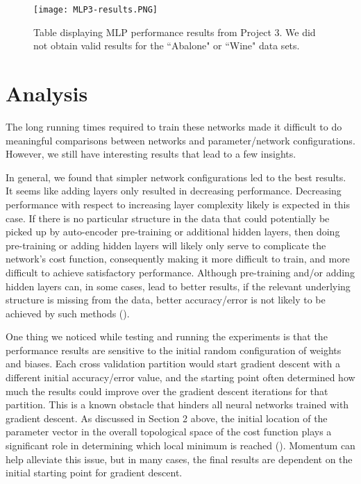 \documentclass[twoside,11pt]{article}
\begin{document}
    \begin{figure}[h]
        \centering
        \texttt{[image: MLP3-results.PNG]}
        \caption{Table displaying MLP performance results from Project 3. We did not obtain valid results for the ``Abalone" or ``Wine" data sets.}
        \label{fig:my_label}
    \end{figure}

\newpage
\section{Analysis}

The long running times required to train these networks made it difficult to do meaningful comparisons between networks and parameter/network configurations. However, we still have interesting results that lead to a few insights.

In general, we found that simpler network configurations led to the best results. It seems like adding layers only resulted in decreasing performance. Decreasing performance with respect to increasing layer complexity likely is expected in this case. If there is no particular structure in the data that could potentially be picked up by auto-encoder pre-training or additional hidden layers, then doing pre-training or adding hidden layers will likely only serve to complicate the network's cost function, consequently making it more difficult to train, and more difficult to achieve satisfactory performance. Although pre-training and/or adding hidden layers can, in some cases, lead to better results, if the relevant underlying structure is missing from the data, better accuracy/error is not likely to be achieved by such methods (\cite{hornik1989multilayer}).
    
One thing we noticed while testing and running the experiments is that the performance results are sensitive to the initial random configuration of weights and biases. Each cross validation partition would start gradient descent with a different initial accuracy/error value, and the starting point often determined how much the results could improve over the gradient descent iterations for that partition. This is a known obstacle that hinders all neural networks trained with gradient descent. As discussed in Section 2 above, the initial location of the parameter vector in the overall topological space of the cost function plays a significant role in determining which local minimum is reached (\cite{erhan2010does}). Momentum can help alleviate this issue, but in many cases, the final results are dependent on the initial starting point for gradient descent.
\end{document}
